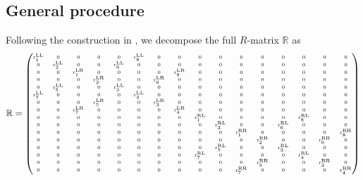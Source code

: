 \documentclass[12pt,a4paper]{article}
\numberwithin{equation}{section}
\newcommand{\bbR}{\mathbb{R}}
\newcommand{\rmr}{\mathrm{r}}
\begin{document}
\subsection{General procedure}\label{subsec:generalprocedure}

 
Following the construction in \cite{Sfondrini:2014via}, we decompose the full $ R $-matrix $\bbR$ as
\begin{equation}
\setcounter{MaxMatrixCols}{16}
{\tiny \bbR=\begin{pmatrix}
	\rmr_1^{{\rm LL}} & 0 & 0 & 0 & 0 & \rmr_8^{{\rm LL}} & 0 & 0 & 0 & 0 & 0 & 0 & 0 & 0 & 0 & 0\\
	0 & \rmr_2^{{\rm LL}} & 0 & 0 & \rmr_6^{{\rm LL}} & 0 & 0 & 0 & 0 & 0 & 0 & 0 & 0 & 0 & 0 & 0\\
	0 & 0 & \rmr_1^{{\rm LR}} & 0 & 0 & 0 & 0 & \rmr_8^{{\rm LR}} & 0 & 0 & 0 & 0 & 0 & 0 & 0 & 0\\
	0 & 0 & 0 & \rmr_2^{{\rm LR}} & 0 & 0 & \rmr_6^{{\rm LR}} & 0 & 0 & 0 & 0 & 0 & 0 & 0 & 0 & 0\\
	0 & \rmr_5^{{\rm LL}} & 0 & 0 & \rmr_3^{{\rm LL}} & 0 & 0 & 0 & 0 & 0 & 0 & 0 & 0 & 0 & 0 & 0\\
	\rmr_7^{{\rm LL}} & 0 & 0 & 0 & 0 & \rmr_4^{{\rm LL}} & 0 & 0 & 0 & 0 & 0 & 0 & 0 & 0 & 0 & 0\\
	0 & 0 & 0 & \rmr_5^{{\rm LR}} & 0 & 0 & \rmr_3^{{\rm LR}} & 0 & 0 & 0 & 0 & 0 & 0 & 0 & 0 & 0\\
	0 & 0 & \rmr_7^{{\rm LR}} & 0 & 0 & 0 & 0 & \rmr_4^{{\rm LR}} & 0 & 0 & 0 & 0 & 0 & 0 & 0 & 0\\
	0 & 0 & 0 & 0 & 0 & 0 & 0 & 0 & \rmr_1^{{\rm RL}} & 0 & 0 & 0 & 0 & \rmr_8^{{\rm RL}} & 0 & 0\\
	0 & 0 & 0 & 0 & 0 & 0 & 0 & 0 & 0 & \rmr_2^{{\rm RL}} & 0 & 0 & \rmr_6^{{\rm RL}} & 0 & 0 & 0\\
	0 & 0 & 0 & 0 & 0 & 0 & 0 & 0 & 0 & 0 & \rmr_1^{{\rm RR}} & 0 & 0 & 0 & 0 & \rmr_8^{{\rm RR}}\\
	0 & 0 & 0 & 0 & 0 & 0 & 0 & 0 & 0 & 0 & 0 & \rmr_2^{{\rm RR}} & 0 & 0 & \rmr_6^{{\rm RR}} & 0\\
	0 & 0 & 0 & 0 & 0 & 0 & 0 & 0 & 0 & \rmr_5^{{\rm RL}} & 0 & 0 & \rmr_3^{{\rm RL}} & 0 & 0 & 0\\
	0 & 0 & 0 & 0 & 0 & 0 & 0 & 0 & \rmr_7^{{\rm RL}} & 0 & 0 & 0 & 0 & \rmr_4^{{\rm RL}} & 0 & 0\\
	0 & 0 & 0 & 0 & 0 & 0 & 0 & 0 & 0 & 0 & 0 & \rmr_5^{{\rm RR}} & 0 & 0 & \rmr_3^{{\rm RR}} & 0\\
	0 & 0 & 0 & 0 & 0 & 0 & 0 & 0 & 0 & 0 & \rmr_7^{{\rm RR}} & 0 & 0 & 0 & 0 & \rmr_4^{{\rm RR}}\\
	\end{pmatrix}} 
\label{fullRmatrixgeneral}
\end{equation}
\end{document}
